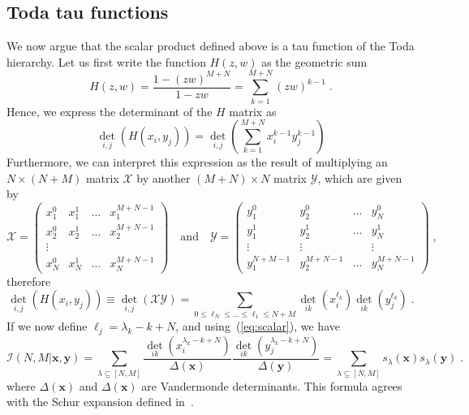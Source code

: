 \documentclass[a4paper,11pt]{amsart}
\begin{document}

\subsection{Toda tau functions}
We now argue that the scalar product defined above is a tau function
of the Toda hierarchy. Let us first write the function \(H(z,w)\) as
the geometric sum
\begin{equation}
\label{eq:h-exp}
  H(z,w) = \frac{1 - (zw)^{M+N}}{1 - zw} = \sum_{k=1}^{M+N} (zw)^{k-1} \; .
\end{equation}
Hence, we express the determinant of the \(H\) matrix as
\begin{equation}
  \det_{i,j} \left(H(x_i, y_j)\right) = \det_{i,j} \left( \sum_{k=1}^{M+N} x_i^{k-1} y_j^{k-1}\right)
\end{equation}
Furthermore, we can interpret this expression as the result of
multiplying an \(N\times (N+M)\) matrix \(\mathcal{X}\) by another
\((M + N)\times N\) matrix \(\mathcal{Y}\), which are given by
\begin{equation}
  \mathcal{X} = 
  \begin{pmatrix}
  x_1^0 & x_1^1 & \dots & x_1^{M+N-1} \\  
  x_2^0 & x_2^1 & \dots & x_2^{M+N-1} \\  
  \vdots \\
  x_N^0 & x_N^1 & \dots & x_N^{M+N-1} 
  \end{pmatrix}\quad \textrm{and} \quad 
  \mathcal{Y} = 
  \begin{pmatrix}
  y_1^0 & y_2^0 & \dots & y_N^0 \\  
  y_1^1 & y_2^1 & \dots & y_N^1 \\  
  \vdots & \vdots & & \vdots \\
  y_1^{N+M-1} & y_2^{M+N-1} & \dots & y_N^{M+N-1}
  \end{pmatrix}\; ,
\end{equation}
therefore 
\begin{equation}
  \det_{i,j} \left(H(x_i, y_j)\right)
  \equiv  \det_{i,j} \left( \mathcal{X}\mathcal{Y}\right)
  = \sum_{0 \leq \ell_{N} \leq \dots \leq \ell_1\leq N+M } \det_{ik}(x_i^{\ell_k}) \det_{ik}(y_j^{\ell_k})\; .
\end{equation}
If we now define \(\ell_j = \lambda_k - k + N\), and
using~(\ref{eq:scalar}), we have
\begin{equation}
\label{eq:scalar_exp}
\mathcal{I}(N, M|\bm{x}, \bm{y}) = \sum_{\lambda\subseteq [N,M]}
\frac{\det_{ik}(x_i^{\lambda_k - k + N})}{\Delta(\bm{x})} \frac{ \det_{ik}(y_j^{\lambda_k - k + N})}{\Delta(\bm{y})}
= \sum_{\lambda\subseteq [N,M]} s_\lambda(\bm{x}) s_\lambda(\bm{y}) \; .
\end{equation}
where \(\Delta(\bm{x})\) and \(\Delta(\bm{x})\) are Vandermonde
determinants. This formula agrees with the Schur expansion defined
in~\cite{Bogoliubov2005}.
\end{document}
